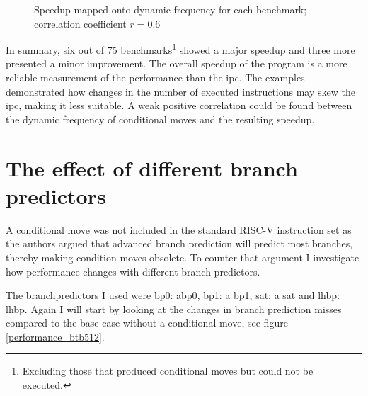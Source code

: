 \documentclass[12pt,twoside,notitlepage]{report}
\begin{document}
\begin{figure}[htp]
\caption{Speedup mapped onto dynamic frequency for each benchmark; correlation coefficient $r=0.6$}
\end{figure}

In summary, six out of 75 benchmarks\footnote{Excluding those that produced conditional moves but could not be executed.} showed a major speedup and three more presented a minor improvement. The overall speedup of the program  is a more reliable measurement of the performance than the \gls{ipc}. The examples demonstrated how changes in the number of executed instructions may skew the \gls{ipc}, making it less suitable. A weak positive correlation could be found between the dynamic frequency of conditional moves and the resulting speedup.


\section{The effect of different branch predictors}

A conditional move was not included in the standard RISC-V instruction set as the authors argued that advanced branch prediction will predict most branches, thereby making condition moves obsolete. To counter that argument I investigate how performance changes with different branch predictors.

The branchpredictors I used were \gls{bp0}: a\acrlong{bp0}, \gls{bp1}: a 
\acrlong{bp1}, \gls{sat}: a \acrlong{sat} and \gls{lhbp}:
\acrlong{lhbp}.
Again I will start by looking at the changes in branch prediction misses compared to the base case without a conditional move, see figure \ref{performance_btb512}.
\end{document}
